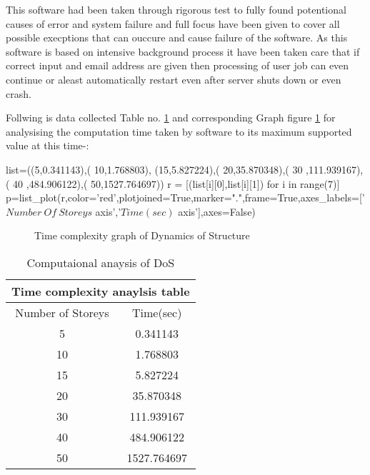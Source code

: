 This software had been taken through rigorous test to fully found potentional causes of error and system failure
and full focus have been given to cover all possible execptions that can 
ouccure and cause failure of the software.
As this software is based on intensive background process it have been taken care that 
if correct input and email address are given then processing of user job can even continue or aleast automatically 
restart even after server shuts down or even crash.

Follwing is data collected Table no. \ref{table} and corresponding Graph figure \ref{fig:graph} for analysising the computation time taken by software 
to its maximum supported value at this time-:
\begin{sagesilent}
list=((5,0.341143),(
10,1.768803),
(15,5.827224),(
20,35.870348),(
30 ,111.939167),(
40 ,484.906122),(
50,1527.764697))
r = [(list[i][0],list[i][1]) for i in range(7)]
p=list_plot(r,color='red',plotjoined=True,marker=".",frame=True,axes_labels=['$Number \ Of \ Storeys$ axis','$Time(sec)$ axis'],axes=False)
\end{sagesilent}

\begin{figure}[H]
	\caption{Time complexity graph of Dynamics of Structure}
	\label{fig:graph}
\end{figure}



\begin{table}[h]
\centering
\begin{tabular}{ ||c|c|| }
\hline
 \multicolumn{2}{||c||}{Time complexity anaylsis table} \\
 \hline
 Number of Storeys & Time(sec) \\ [0.5ex] 
 \hline \hline
	5 & 0.341143 \\
	10 & 1.768803 \\
	15 & 5.827224 \\
	20 & 35.870348 \\
	30 & 111.939167 \\
	40 & 484.906122 \\
	50 & 1527.764697 \\ [1ex]
 \hline
\end{tabular}
\caption{Computaional anaysis of DoS}
\label{table}
\end{table}


